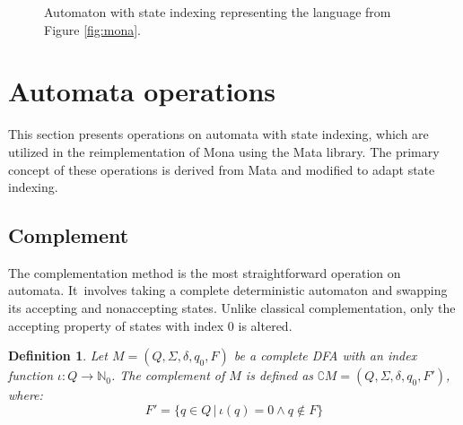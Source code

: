 \documentclass[pdflatex,sn-mathphys-num]{sn-jnl}%
\theoremstyle{thmstyleone}%
\theoremstyle{thmstyletwo}%
\theoremstyle{thmstylethree}%
\newtheorem{definition}{Definition}%
\begin{document}
        \begin{figure}[h]
            \centering
            \caption{Automaton with state indexing representing the language from Figure \ref{fig:mona}.}
        \end{figure}

\section{Automata operations}
    This section presents operations on automata with state indexing, which are utilized in the reimplementation of Mona using the Mata library. The primary concept of these operations is derived from Mata and modified to adapt state indexing.

    \subsection{Complement}
        The complementation method is the most straightforward operation on automata. It~involves taking a complete deterministic automaton and swapping its accepting and nonaccepting states. Unlike classical complementation, only the accepting property of states with index $0$ is altered.

        \vspace*{0.5em}

        \begin{definition}
            Let $M = (Q, \Sigma, \delta, q_0, F)$ be a complete DFA with an index function $\iota : Q \rightarrow \mathbb{N}_0$. The complement of $M$ is defined as $\complement M = (Q, \Sigma, \delta, q_0, F')$, where:
            $$
            F' = \{q \in Q\,|\, \iota(q) = 0 \land q \notin F\}
            $$
        \end{definition}
\end{document}
